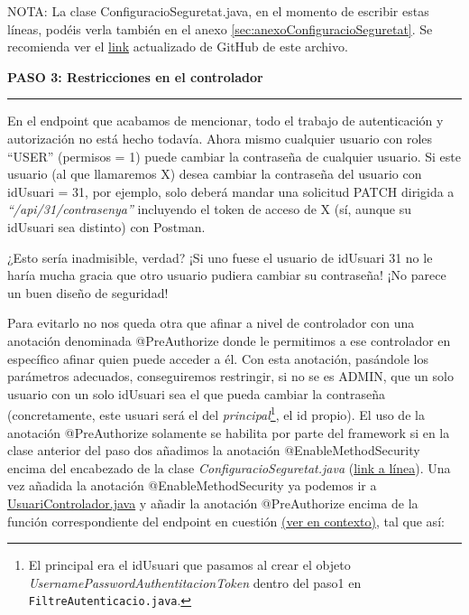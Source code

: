 \documentclass[a4paper,12pt]{report}
\begin{document}
			NOTA: La clase ConfiguracioSeguretat.java, en el momento de escribir estas líneas, podéis verla también en el anexo \ref{sec:anexoConfiguracioSeguretat}. Se recomienda ver el \href{https://github.com/blackcub3s/mercApp/blob/main/APP%20WEB/__springboot__produccio__/app/src/main/java/miApp/app/seguretat/ConfiguracioSeguretat.java}{link} actualizado de GitHub de este archivo.
		
		
		\noindent \textbf{PASO 3: Restricciones en el controlador}
		\hrule
		\vspace{1em}
		
		En el endpoint que acabamos de mencionar, todo el trabajo de autenticación y autorización no está hecho todavía. Ahora mismo cualquier usuario con roles ``USER'' (permisos = 1) puede cambiar la contraseña de cualquier usuario. Si este usuario (al que llamaremos X) desea cambiar la contraseña del usuario con idUsuari = 31, por ejemplo, solo deberá mandar una solicitud PATCH dirigida a \textit{``/api/31/contrasenya''} incluyendo el token de acceso de X (sí, aunque su idUsuari sea distinto) con Postman.
		
		¿Esto sería inadmisible, verdad? ¡Si uno fuese el usuario de idUsuari 31 no le haría mucha gracia que otro usuario pudiera cambiar su contraseña! ¡No parece un buen diseño de seguridad!
		
		Para evitarlo no nos queda otra que afinar a nivel de controlador con una anotación denominada @PreAuthorize donde le permitimos a ese controlador en específico afinar quien puede acceder a él. Con esta anotación, pasándole los parámetros adecuados, conseguiremos restringir, si no se es ADMIN, que un solo usuario con un solo idUsuari sea el que pueda cambiar la contraseña (concretamente, este usuari será el del \textit{principal}\footnote{El principal era el idUsuari que pasamos al crear el objeto \textit{UsernamePasswordAuthentitacionToken} dentro del paso1 en \texttt{FiltreAutenticacio.java}.}, el id propio).  El uso de la anotación @PreAuthorize solamente se habilita por parte del framework si en la clase anterior del paso dos añadimos la anotación @EnableMethodSecurity encima del encabezado de la clase \textit{ConfiguracioSeguretat.java} (\href{https://github.com/blackcub3s/mercApp/blob/db26ff53664be55223c793cf9b52ade87688be45/APP%20WEB/__springboot__produccio__/app/src/main/java/miApp/app/seguretat/ConfiguracioSeguretat.java#L16}{link a línea}). Una vez añadida la anotación @EnableMethodSecurity ya podemos ir a \href{		https://github.com/blackcub3s/mercApp/blob/db26ff53664be55223c793cf9b52ade87688be45/APP%20WEB/__springboot__produccio__/app/src/main/java/miApp/app/Usuaris/controlador/UsuariControlador.java#L263}{UsuariControlador.java} y añadir la anotación @PreAuthorize encima de la función correspondiente del endpoint en cuestión \href{https://github.com/blackcub3s/mercApp/blob/db26ff53664be55223c793cf9b52ade87688be45/APP%20WEB/__springboot__produccio__/app/src/main/java/miApp/app/Usuaris/controlador/UsuariControlador.java#L263}{(ver en contexto)}, tal que así:
		
\end{document}
